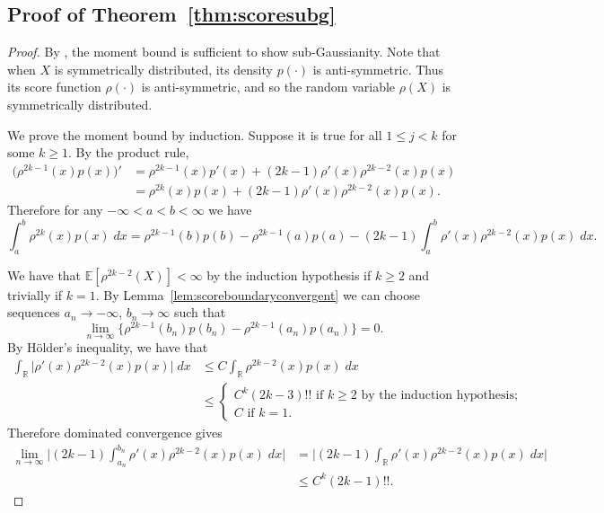 \documentclass[aos]{imsart}
\newcommand{\R}{\mathbb{R}}
\newcommand{\E}{\mathbb{E}}
\begin{document}
	\subsection{Proof of Theorem~\ref{thm:scoresubg}}
	\begin{proof}
		By \citet[Thm.~2.6]{WainwrightHighDim}, the moment bound is sufficient to show sub-Gaussianity. Note that when $X$ is symmetrically distributed, its density $p(\cdot)$ is anti-symmetric. Thus its score function $\rho(\cdot)$ is anti-symmetric, and so the random variable $\rho(X)$ is symmetrically distributed.
		
		We prove the moment bound by induction. Suppose it is true for all $1\leq j<k$ for some $k\geq 1$. By the product rule, \begin{align*}
			\big(\rho^{2k-1}(x)p(x)\big)' &= \rho^{2k-1}(x)p'(x) + (2k-1) \rho'(x)\rho^{2k-2}(x)p(x)\\
			&= \rho^{2k}(x)p(x) + (2k-1) \rho'(x)\rho^{2k-2}(x)p(x).
		\end{align*}
		Therefore for any $-\infty<a<b<\infty$ we have \begin{equation}
			\int_a^b \rho^{2k}(x)p(x)\; dx = \rho^{2k-1}(b)p(b)-\rho^{2k-1}(a)p(a)  - (2k-1)\int_a^b  \rho'(x)\rho^{2k-2}(x)p(x)\; dx. \label{eqn:scoreintbyparts}
		\end{equation}
		
		We have that $\E[\rho^{2k-2}(X)]<\infty$ by the induction hypothesis if $k\geq 2$ and trivially if $k=1$. By Lemma~\ref{lem:scoreboundaryconvergent} we can choose sequences $a_n\to-\infty$, $b_n\to\infty$ such that \begin{equation*}
			\lim_{n\to\infty} \big\{\rho^{2k-1}(b_n)p(b_n)-\rho^{2k-1}(a_n)p(a_n)\big\} = 0.
		\end{equation*} By H\"older's inequality, we have that \begin{align*}
			\int_\R  \big|\rho'(x)\rho^{2k-2}(x)p(x) \big|\; dx &\leq C \int_\R  \rho^{2k-2}(x)p(x) \; dx\\
			&\leq \begin{cases}
				C^k (2k-3)!! \text{ if $k\geq 2$ by the induction hypothesis};\\
				C \text{ if $k=1$}.
			\end{cases}
		\end{align*}
		Therefore dominated convergence gives \begin{align*}
			\lim_{n\to\infty} \bigg|(2k-1)\int_{a_n}^{b_n}  \rho'(x)\rho^{2k-2}(x)p(x)\; dx\bigg| &= \bigg|(2k-1)\int_\R  \rho'(x)\rho^{2k-2}(x)p(x)\; dx\bigg|\\
			&\leq C^k(2k-1)!!.
		\end{align*}
		

\end{proof}
\end{document}
